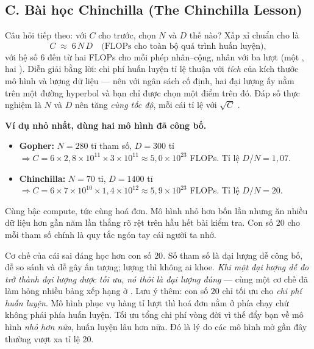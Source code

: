 \documentclass[../../../deep_learning.tex]{subfiles}
\begin{document}
\subsection{C. Bài học Chinchilla (The Chinchilla Lesson)}
Câu hỏi tiếp theo: với $C$ cho trước, chọn $N$ và $D$ thế nào? Xấp xỉ chuẩn cho  là
\[
C \;\approx\; 6\,N\,D \quad \text{(FLOPs cho toàn bộ quá trình huấn luyện)},
\]
với hệ số 6 đến từ hai FLOPs cho mỗi phép nhân--cộng, nhân với ba lượt (một , hai ). Diễn giải bằng lời: chi phí huấn luyện tỉ lệ thuận với \emph{tích} của kích thước mô hình và lượng dữ liệu --- nên với ngân sách cố định, hai đại lượng ấy nằm trên một đường hyperbol và bạn chỉ được chọn một điểm trên đó. Đáp số thực nghiệm là $N$ và $D$ nên tăng \emph{cùng tốc độ}, mỗi cái tỉ lệ với $\sqrt{C}$ \cite{hoffmann2022chinchilla}.

\textbf{Ví dụ nhỏ nhất, dùng hai mô hình đã công bố.}

\begin{itemize}
\item \textbf{Gopher:} $N = 280$ tỉ tham số, $D = 300$ tỉ  $\Rightarrow C = 6 \times 2{,}8{\times}10^{11} \times 3{\times}10^{11} \approx 5{,}0{\times}10^{23}$ FLOPs. Tỉ lệ $D/N = 1{,}07$.
\item \textbf{Chinchilla:} $N = 70$ tỉ, $D = 1400$ tỉ  $\Rightarrow C = 6 \times 7{\times}10^{10} \times 1{,}4{\times}10^{12} \approx 5{,}9{\times}10^{23}$ FLOPs. Tỉ lệ $D/N = 20$.
\end{itemize}

Cùng bậc compute, tức cùng hoá đơn. Mô hình nhỏ hơn bốn lần nhưng ăn nhiều dữ liệu hơn gần năm lần thắng rõ rệt trên hầu hết bài kiểm tra. Con số $20$  cho mỗi tham số chính là quy tắc ngón tay cái người ta nhớ.

Cơ chế của cái sai đáng học hơn con số $20$. Số tham số là đại lượng dễ công bố, dễ so sánh và dễ gây ấn tượng; lượng  thì không ai khoe. \emph{Khi một đại lượng dễ đo trở thành đại lượng được tối ưu, nó thôi là đại lượng đúng} --- cùng một cơ chế đã làm hỏng nhiều bảng xếp hạng ở . Lưu ý thêm: con số $20$ chỉ tối ưu cho \emph{chi phí huấn luyện}. Mô hình phục vụ hàng tỉ lượt  thì hoá đơn nằm ở phía chạy chứ không phải phía huấn luyện. Tối ưu tổng chi phí vòng đời vì thế đẩy bạn về mô hình \emph{nhỏ hơn nữa}, huấn luyện lâu hơn nữa. Đó là lý do các mô hình mở gần đây thường vượt xa tỉ lệ 20.
\end{document}
